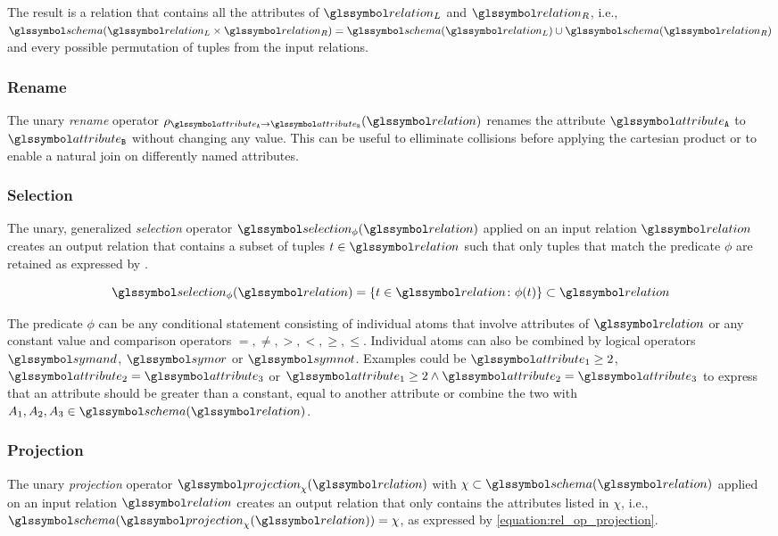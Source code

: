 The result is a relation that contains all the attributes of $\relation_L$ and $\relation_R$, i.e., $\schema(\relation_L \times \relation_R) = \schema(\relation_L) \cup \schema(\relation_R)$ and every possible permutation of tuples from the input relations.

\subsubsection{Rename}
The unary \emph{rename} operator $\rho_{\attribute_\mathtt{A} \rightarrow \attribute_\mathtt{B}}(\relation)$ renames the attribute $\attribute_\mathtt{A}$ to $\attribute_\mathtt{B}$ without changing any value. This can be useful to elliminate collisions before applying the cartesian product or to enable a natural join on differently named attributes.

\subsubsection{Selection}

The unary, generalized \emph{selection} operator $\selection_{\phi}(\relation)$ applied on an input relation $\relation$ creates an output relation that contains a subset of tuples $t \in \relation$ such that only tuples that match the predicate $\phi$ are retained as expressed by .

\begin{equation}
    \label{equation:rel_op_selection}
    \selection_{\phi}(\relation) = \{ t \in \relation \colon \phi(t) \} \subset \relation
\end{equation}

The predicate $\phi$ can be any conditional statement consisting of individual atoms that involve attributes of $\relation$ or any constant value and comparison operators $=,\neq,>,<,\geq, \leq$. Individual atoms can also be combined by logical operators $\symand$, $\symor$ or $\symnot$. Examples could be $\attribute_1 \geq 2$, $\attribute_2 = \attribute_3$ or $\attribute_1 \geq 2 \wedge \attribute_2 = \attribute_3$ to express that an attribute should be greater than a constant, equal to another attribute or combine the two with $A_1,A_2,A_3 \in \schema(\relation)$.


\subsubsection{Projection}
The unary \emph{projection} operator $\projection_{\chi}(\relation)$ with $\chi \subset \schema(\relation)$ applied on an input relation $\relation$ creates an output relation that only contains the attributes listed in $\chi$, i.e., $\schema(\projection_{\chi}(\relation)) = \chi$, as expressed by \cref{equation:rel_op_projection}.

